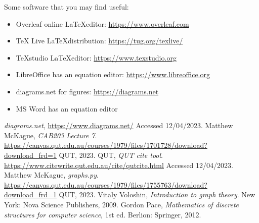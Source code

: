 \documentclass[a4paper]{article}
\begin{document}
Some software that you may find useful:
\begin{itemize}
    \item Overleaf online \LaTeX editor: \url{https://www.overleaf.com}
    \item TeX Live \LaTeX distribution: \url{https://tug.org/texlive/}
    \item TeXstudio \LaTeX editor: \url{https://www.texstudio.org}
    \item LibreOffice has an equation editor: \url{https://www.libreoffice.org}
    \item diagrams.net for figures: \url{https://diagrams.net}
    \item MS Word has an equation editor 
\end{itemize}

\begin{thebibliography}{9}
        \emph{diagrams.net},
        \url{https://www.diagrams.net/}
        Accessed 12/04/2023.
        Matthew McKague,
        \emph{CAB203 Lecture 7}.
        \url{https://canvas.qut.edu.au/courses/1979/files/1701728/download?download_frd=1}
        QUT, 2023.
        QUT,
        \emph{QUT cite tool}.
        \url{https://www.citewrite.qut.edu.au/cite/qutcite.html}
        Accessed 12/04/2023.
        Matthew McKague,
        \emph{graphs.py}.
        \url{https://canvas.qut.edu.au/courses/1979/files/1755763/download?download_frd=1}
        QUT, 2023.
        Vitaly Voloshin,
        \emph{Introduction to graph theory}.
        New York: Nova Science Publishers, 2009.
        Gordon Pace,
        \emph{Mathematics of discrete structures for computer science},
        1st ed. Berlion: Springer, 2012.
\end{thebibliography}
\end{document}
